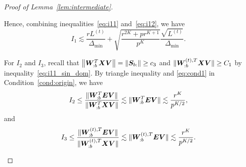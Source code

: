 \documentclass[lettersize,onecolumn,journal]{IEEEtran}
\theoremstyle{definition}
\theoremstyle{definition}
\newcommand{\of}[1]{\left(#1\right)}
\newcommand{\aabs}[1]{\left|#1\right|}
\begin{document}
\begin{proof}[Proof of Lemma~\ref{lem:intermediate}]
\begin{enumerate}
     
    Hence, combining inequalities~\eqref{eq:i11} and~\eqref{eq:i12},  we have 
    \begin{equation}\label{eq:i1}
        I_1 \lesssim \frac{r L^{(t)}}{\Delta_{\min}} + \sqrt{\frac{ r^{2K} + p r^{K+1}}{p^K}} \frac{\sqrt{L^{(t)}}}{\Delta_{\min}}.
    \end{equation}
    
    
    
    For $I_2$ and $I_3$, recall that $\left\lVert\bm{W}_{:b}^T \bm X \bm{V}\right\rVert = \left\lVert\bm S_{b:}\right\rVert \geq c_3$ and $\lVert  \bm{W}_{:b}^{(t),T} \bm X \bm{V} \rVert \geq C_1$ by inequality~\eqref{eq:i11_sin_dom}. By triangle inequality and \eqref{eq:cond1} in Condition~\ref{cond:origin}, we have 
    \begin{equation}\label{eq:i2}
         I_2 \leq \frac{ \onormSize{}{ \mW_{:b}^T \mE \mV } }{ \onormSize{}{\mW_{:b}^T \mX \mV}  } \lesssim  \onormSize{}{ \mW_{:b}^T \mE \mV }  \lesssim \frac{r^K}{p^{K/2}},
    \end{equation}
    and 
    \begin{equation}\label{eq:i3}
        I_3 \leq \frac{ \onormSize{}{ \mW_{:b}^{(t),T} \mE \mV } }{ \onormSize{}{\mW_{:b}^{(t),T} \mX \mV}  }  \lesssim \onormSize{}{ \mW_{:b}^{(t),T} \mE \mV } \lesssim \frac{r^K}{p^{K/2}}.
     \end{equation}
    
    
    

\end{enumerate}
\end{proof}
\end{document}
